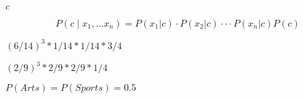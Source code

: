\documentclass[10pt]{book}
\begin{document}
\begin{mdSnippets}
\begin{mdInlineSnippet}[4a8a08f09d37b73795649038408b5f33]%
$c$\end{mdInlineSnippet}%
\begin{mdDisplaySnippet}[2cb4451452624fd0ce4c3afdd6d51f95]%
\[%
P(c \mid x_1, ... x_n) = P(x_1|c)⋅P(x_2|c)⋅⋅⋅P(x_n|c) P(c)
\]%
\end{mdDisplaySnippet}%
\begin{mdInlineSnippet}[3cf1de5d88668faac4491155789e29e6]%
$(6/14)^3 * 1/14 * 1/14 * 3/4$\end{mdInlineSnippet}%
\begin{mdInlineSnippet}[385b7a3dad381564c253c98b98989f7e]%
$(2/9)^3 * 2/9 * 2/9 * 1/4$\end{mdInlineSnippet}%
\begin{mdInlineSnippet}%
$P(Arts) = P(Sports) = 0.5$\end{mdInlineSnippet}%

\end{mdSnippets}
\end{document}

